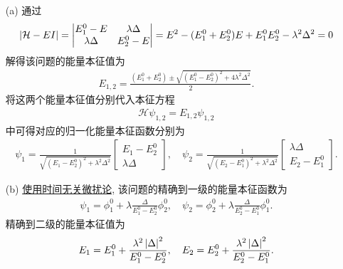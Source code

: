 \documentclass{assignment}
\begin{document}
\begin{sol}
    \begin{itemize}
        \item[(a)] 通过
        \begin{align}
            \left\lvert\mathcal{H}-EI\right\rvert=\begin{vmatrix}
                E_1^0-E&\lambda\Delta\\
                \lambda\Delta&E_2^0-E
            \end{vmatrix}=E^2-(E_1^0+E_2^0)E+E_1^0E_2^0-\lambda^2\Delta^2=0
        \end{align}
        解得该问题的能量本征值为
        \begin{align}
            E_{1,2}=\frac{(E_1^0+E_2^0)\pm\sqrt{(E_1^0-E_2^0)^2+4\lambda^2\Delta^2}}{2}.
        \end{align}
        将这两个能量本征值分别代入本征方程
        \begin{align}
            \mathcal{H}\psi_{1,2}=E_{1,2}\psi_{1,2}
        \end{align}
        中可得对应的归一化能量本征函数分别为
        \begin{align}
            \psi_1=\frac{1}{\sqrt{(E_1-E_2^0)^2+\lambda^2\Delta^2}}\begin{bmatrix}
                E_1-E_2^0\\
                \lambda\Delta
            \end{bmatrix},\quad\psi_2=\frac{1}{\sqrt{(E_2-E_1^0)^2+\lambda^2\Delta^2}}\begin{bmatrix}
                \lambda\Delta\\
                E_2-E_1^0
            \end{bmatrix}.
        \end{align}
        \item[(b)] \uline{使用时间无关微扰论,} 该问题的精确到一级的能量本征函数为
        \begin{align}
            \psi_1=\phi_1^0+\lambda\frac{\Delta}{E_1^0-E_2^0}\phi_2^0,\quad\psi_2=\phi_2^0+\lambda\frac{\Delta}{E_2^0-E_1^0}\phi_1^0.
        \end{align}
        精确到二级的能量本征值为
        \begin{align}
            E_1=E_1^0+\frac{\lambda^2\left\lvert\Delta\right\rvert^2}{E_1^0-E_2^0},\quad E_2=E_2^0+\frac{\lambda^2\left\lvert\Delta\right\rvert^2}{E_2^0-E_1^0}.
        \end{align}


\end{itemize}
\end{sol}
\end{document}
